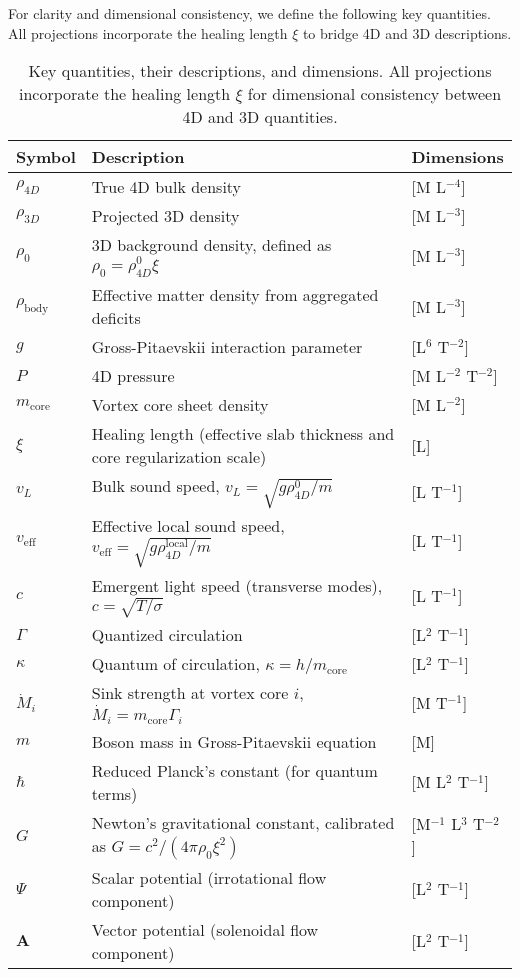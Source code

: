 For clarity and dimensional consistency, we define the following key quantities. All projections incorporate the healing length $\xi$ to bridge 4D and 3D descriptions.

\begin{table}[H]
\centering
\begin{tabular}{|l|l|l|}
\hline
Symbol & Description & Dimensions \\
\hline
$\rho_{4D}$ & True 4D bulk density & [M L$^{-4}$] \\
\hline
$\rho_{3D}$ & Projected 3D density & [M L$^{-3}$] \\
\hline
$\rho_0$ & 3D background density, defined as $\rho_0 = \rho_{4D}^0 \xi$ & [M L$^{-3}$] \\
\hline
$\rho_{\text{body}}$ & Effective matter density from aggregated deficits & [M L$^{-3}$] \\
\hline
$g$ & Gross-Pitaevskii interaction parameter & [L$^6$ T$^{-2}$] \\
\hline
$P$ & 4D pressure & [M L$^{-2}$ T$^{-2}$] \\
\hline
$m_{\text{core}}$ & Vortex core sheet density & [M L$^{-2}$] \\
\hline
$\xi$ & Healing length (effective slab thickness and core regularization scale) & [L] \\
\hline
$v_L$ & Bulk sound speed, $v_L = \sqrt{g \rho_{4D}^0 / m}$ & [L T$^{-1}$] \\
\hline
$v_{\text{eff}}$ & Effective local sound speed, $v_{\text{eff}} = \sqrt{g \rho_{4D}^{\text{local}} / m}$ & [L T$^{-1}$] \\
\hline
$c$ & Emergent light speed (transverse modes), $c = \sqrt{T / \sigma}$ & [L T$^{-1}$] \\
\hline
$\Gamma$ & Quantized circulation & [L$^2$ T$^{-1}$] \\
\hline
$\kappa$ & Quantum of circulation, $\kappa = h / m_{\text{core}}$ & [L$^2$ T$^{-1}$] \\
\hline
$\dot{M}_i$ & Sink strength at vortex core $i$, $\dot{M}_i = m_{\text{core}} \Gamma_i$ & [M T$^{-1}$] \\
\hline
$m$ & Boson mass in Gross-Pitaevskii equation & [M] \\
\hline
$\hbar$ & Reduced Planck's constant (for quantum terms) & [M L$^2$ T$^{-1}$] \\
\hline
$G$ & Newton's gravitational constant, calibrated as $G = c^2 / (4\pi \rho_0 \xi^2)$ & [M$^{-1}$ L$^3$ T$^{-2}$] \\
\hline
$\Psi$ & Scalar potential (irrotational flow component) & [L$^2$ T$^{-1}$] \\
\hline
$\mathbf{A}$ & Vector potential (solenoidal flow component) & [L$^2$ T$^{-1}$] \\
\hline
\end{tabular}
\caption{Key quantities, their descriptions, and dimensions. All projections incorporate the healing length $\xi$ for dimensional consistency between 4D and 3D quantities.}
\label{tab:notation}
\end{table}

